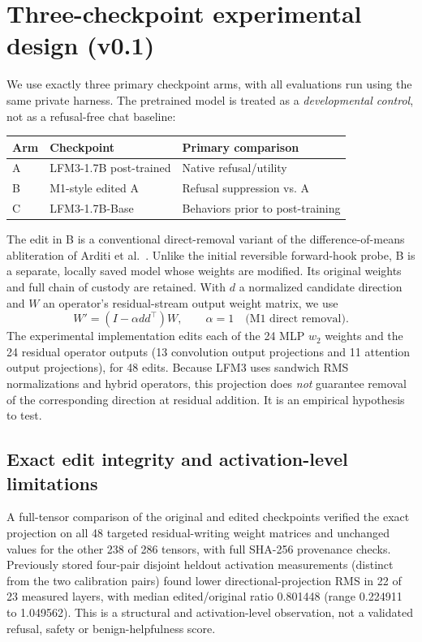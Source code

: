 \documentclass[11pt]{article}
\begin{document}
\section{Three-checkpoint experimental design (v0.1)}
We use exactly three primary checkpoint arms, with all evaluations run
using the same private harness. The pretrained model is treated as a
\emph{developmental control}, not as a refusal-free chat baseline:
\begin{center}
\begin{tabular}{lll}
\toprule
Arm & Checkpoint & Primary comparison \\
\midrule
A & LFM3-1.7B post-trained & Native refusal/utility \\
B & M1-style edited A & Refusal suppression vs. A \\
C & LFM3-1.7B-Base & Behaviors prior to post-training \\
\bottomrule
\end{tabular}
\end{center}
The edit in B is a conventional direct-removal variant of the
difference-of-means abliteration of Arditi et al.\ \cite{arditi2024}.
Unlike the initial reversible forward-hook probe, B is a separate,
locally saved model whose weights are modified. Its original weights
and full chain of custody are retained. With $d$ a normalized
candidate direction and $W$ an operator's residual-stream output
weight matrix, we use
\[
W'=(I-\alpha dd^{\top})W,\qquad\alpha=1\quad\text{(M1 direct removal)}.
\]
The experimental implementation edits each of the 24 MLP $w_2$
weights and the 24 residual operator outputs (13 convolution output
projections and 11 attention output projections), for 48 edits.
Because LFM3 uses sandwich RMS normalizations and hybrid operators,
this projection does \emph{not} guarantee removal of the corresponding
direction at residual addition. It is an empirical hypothesis to test.

\subsection{Exact edit integrity and activation-level limitations}
A full-tensor comparison of the original and edited checkpoints
verified the exact projection on all 48 targeted residual-writing
weight matrices and unchanged values for the other 238 of 286
tensors, with full SHA-256 provenance checks. Previously stored
four-pair disjoint heldout activation measurements (distinct from
the two calibration pairs) found lower directional-projection
RMS in 22 of 23 measured layers, with median edited/original
ratio 0.801448 (range 0.224911 to 1.049562).
This is a structural and activation-level observation, not a
validated refusal, safety or benign-helpfulness score.
\end{document}
